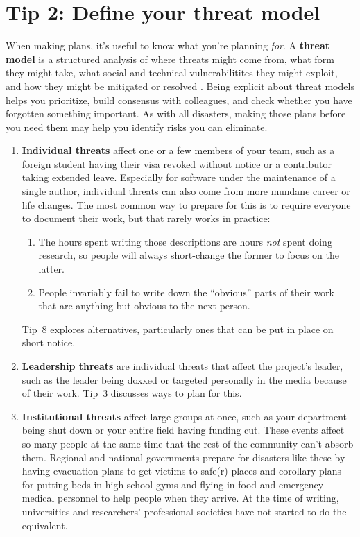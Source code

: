 \documentclass[10pt,letterpaper]{article}
\begin{document}
\section*{Tip 2: Define your threat model}

When making plans, it's useful to know what you're planning \emph{for}.
A \textbf{threat model} is a structured analysis of where threats might come from,
what form they might take,
what social and technical vulnerabilitites they might exploit,
and how they might be mitigated or resolved \cite{Torr2005}.
Being explicit about threat models helps you prioritize,
build consensus with colleagues,
and check whether you have forgotten something important.
As with all disasters,
making those plans before you need them may help you identify risks you can eliminate.

\begin{enumerate}
\item
  \textbf{Individual threats} affect one or a few members of your team,
  such as a foreign student having their visa revoked without notice
  or a contributor taking extended leave.
  Especially for software under the maintenance of a single author,
  individual threats can also come from more mundane career or life changes.
  The most common way to prepare for this is to require everyone to document their work,
  but that rarely works in practice:
  \begin{enumerate}
  \item
    The hours spent writing those descriptions are hours \emph{not} spent doing research,
    so people will always short-change the former to focus on the latter.
  \item
    People invariably fail to write down the ``obvious'' parts of their work
    that are anything but obvious to the next person.
  \end{enumerate}
  Tip~8 explores alternatives,
  particularly ones that can be put in place on short notice.

\item
  \textbf{Leadership threats} are individual threats that affect the project's leader,
  such as the leader being doxxed or targeted personally in the media because of their work.
  Tip~3 discusses ways to plan for this.

\item
  \textbf{Institutional threats} affect large groups at once,
  such as your department being shut down
  or your entire field having funding cut.
  These events affect so many people at the same time
  that the rest of the community can't absorb them.
  Regional and national governments prepare for disasters like these
  by having evacuation plans to get victims to safe(r) places
  and corollary plans for putting beds in high school gyms
  and flying in food and emergency medical personnel to help people when they arrive.
  At the time of writing,
  universities and researchers' professional societies have not started to do the equivalent.


\end{enumerate}
\end{document}
